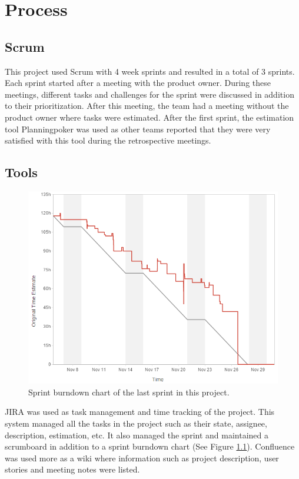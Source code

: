 \chapter{Process}
\label{chap:process}

\section{Scrum}
\label{sec:sysDevMethod}
This project used Scrum with 4 week sprints and resulted in a total of 3 sprints. Each sprint started after a meeting with the product owner. During these meetings, different tasks and challenges for the sprint were discussed in addition to their prioritization. After this meeting, the team had a meeting without the product owner where tasks were estimated. After the first sprint, the estimation tool Planningpoker \cite{Plann81:online} was used as other teams reported that they were very satisfied with this tool during the retrospective meetings. 

\section{Tools}
\label{sec:tools}

\begin{figure}[h]
  \centering
  \includegraphics[width=.5\textwidth]{figures/sprint_burndown.png}
  \caption[Sprint burndown.]{Sprint burndown chart of the last sprint in this project.}
  \label{fig:sprintBurndown}
\end{figure}

JIRA was used as task management and time tracking of the project. This system managed all the tasks in the project such as their state, assignee, description, estimation, etc. It also managed the sprint and maintained a scrumboard in addition to a sprint burndown chart (See Figure \ref{fig:sprintBurndown}). Confluence was used more as a wiki where information such as project description, user stories and meeting notes were listed.

